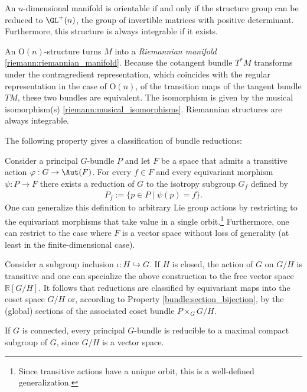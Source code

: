     \begin{example}\label{bundle:orientable_structure}
        An $n$-dimensional manifold is orientable if and only if the structure group can be reduced to $\GL^+(n)$, the group of invertible matrices with positive determinant. Furthermore, this structure is always integrable if it exists.
    \end{example}
    \begin{example}\label{bundle:riemannian_G_structure}
        An $\mathrm{O}(n)$-structure turns $M$ into a \textit{Riemannian manifold} \ref{riemann:riemannian_manifold}. Because the cotangent bundle $T^*M$ transforms under the contragredient representation, which coincides with the regular representation in the case of $\mathrm{O}(n)$, of the transition maps of the tangent bundle $TM$, these two bundles are equivalent. The isomorphism is given by the musical isomorphism(s) \ref{riemann:musical_isomorphisms}. Riemannian structures are always integrable.
    \end{example}

    The following property gives a classification of bundle reductions:
    \begin{property}\label{bundle:reduction_classification}
        Consider a principal $G$-bundle $P$ and let $F$ be a space that admits a transitive action $\varphi:G\rightarrow\Aut(F)$. For every $f\in F$ and every equivariant morphism $\psi:P\rightarrow F$ there exists a reduction of $G$ to the isotropy subgroup $G_f$ defined by
        \begin{gather}
            P_f := \{p\in P\mid\psi(p) = f\}.
        \end{gather}
        One can generalize this definition to arbitrary Lie group actions by restricting to the equivariant morphisms that take value in a single orbit.\footnote{Since transitive actions have a unique orbit, this is a well-defined generalization.} Furthermore, one can restrict to the case where $F$ is a vector space without loss of generality (at least in the finite-dimensional case).

        Consider a subgroup inclusion $\iota:H\hookrightarrow G$. If $H$ is closed, the action of $G$ on $G/H$ is transitive and one can specialize the above construction to the free vector space $\mathbb{R}[G/H]$. It follows that reductions are classified by equivariant maps into the coset space $G/H$ or, according to Property \ref{bundle:section_bijection}, by the (global) sections of the associated coset bundle $P\times_GG/H$.
    \end{property}
    \begin{result}
        If $G$ is connected, every principal $G$-bundle is reducible to a maximal compact subgroup of $G$, since $G/H$ is a vector space.
    \end{result}

